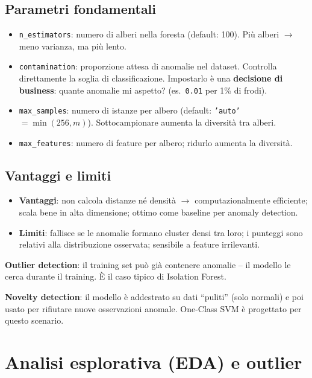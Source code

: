 \subsection{Parametri fondamentali}

\begin{itemize}
    \item \texttt{n\_estimators}: numero di alberi nella foresta (default: 100). Più alberi $\to$ meno varianza, ma più lento.
    \item \texttt{contamination}: proporzione attesa di anomalie nel dataset. Controlla direttamente la soglia di classificazione. Impostarlo è una \textbf{decisione di business}: quante anomalie mi aspetto? (es.\ \texttt{0.01} per 1\% di frodi).
    \item \texttt{max\_samples}: numero di istanze per albero (default: \texttt{'auto'} $= \min(256, m)$). Sottocampionare aumenta la diversità tra alberi.
    \item \texttt{max\_features}: numero di feature per albero; ridurlo aumenta la diversità.
\end{itemize}

\subsection{Vantaggi e limiti}

\begin{itemize}
    \item \textbf{Vantaggi}: non calcola distanze né densità $\to$ computazionalmente efficiente; scala bene in alta dimensione; ottimo come baseline per anomaly detection.
    \item \textbf{Limiti}: fallisce se le anomalie formano cluster densi tra loro; i punteggi sono relativi alla distribuzione osservata; sensibile a feature irrilevanti.
\end{itemize}

\begin{notebox}
\textbf{Outlier detection}: il training set può già contenere anomalie -- il modello le cerca durante il training. È il caso tipico di Isolation Forest.

\textbf{Novelty detection}: il modello è addestrato su dati ``puliti'' (solo normali) e poi usato per rifiutare nuove osservazioni anomale. One-Class SVM è progettato per questo scenario.
\end{notebox}

\section{Analisi esplorativa (EDA) e outlier}


